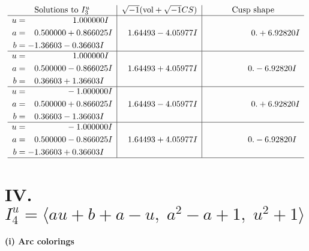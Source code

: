 \documentclass[1p]{elsarticle_modified}
\theoremstyle{definition}
\newcommand{\I}{\sqrt{-1}}
\begin{document}
$$\begin{array}{c|c|c}  
\text{Solutions to }I^u_{3}& \I (\text{vol} + \sqrt{-1}CS) & \text{Cusp shape}\\
 \hline 
\begin{aligned}
u &= \phantom{-0.000000 -}1.000000 I \\
a &= \phantom{-}0.500000 + 0.866025 I \\
b &= -1.36603 - 0.36603 I\end{aligned}
 & \phantom{-}1.64493 - 4.05977 I & \phantom{-0.000000 -}0. + 6.92820 I \\ \hline\begin{aligned}
u &= \phantom{-0.000000 -}1.000000 I \\
a &= \phantom{-}0.500000 - 0.866025 I \\
b &= \phantom{-}0.36603 + 1.36603 I\end{aligned}
 & \phantom{-}1.64493 + 4.05977 I & \phantom{-0.000000 } 0. - 6.92820 I \\ \hline\begin{aligned}
u &= \phantom{-0.000000 } -1.000000 I \\
a &= \phantom{-}0.500000 + 0.866025 I \\
b &= \phantom{-}0.36603 - 1.36603 I\end{aligned}
 & \phantom{-}1.64493 - 4.05977 I & \phantom{-0.000000 -}0. + 6.92820 I \\ \hline\begin{aligned}
u &= \phantom{-0.000000 } -1.000000 I \\
a &= \phantom{-}0.500000 - 0.866025 I \\
b &= -1.36603 + 0.36603 I\end{aligned}
 & \phantom{-}1.64493 + 4.05977 I & \phantom{-0.000000 } 0. - 6.92820 I\\
 \hline 
 \end{array}$$\newpage\newpage\renewcommand{\arraystretch}{1}
\centering \section*{IV. $I^u_{4}= \langle a u+b+a- u,\;a^2- a+1,\;u^2+1 \rangle$}
\flushleft \textbf{(i) Arc colorings}\\
\end{document}
